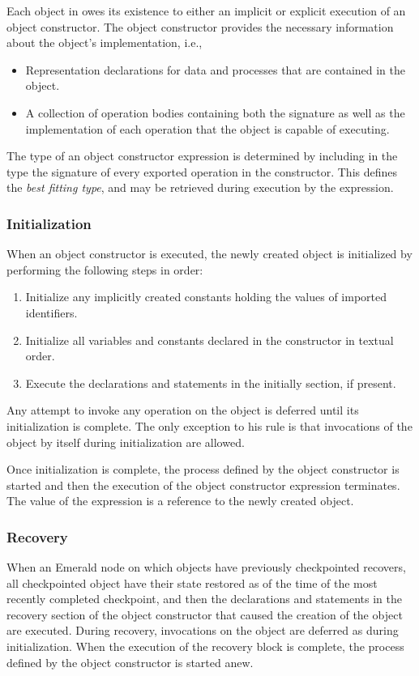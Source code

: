 Each object in \emd{} owes its existence to either an implicit or explicit
execution of an object constructor. The object constructor provides the
necessary information about the object's implementation, i.e.,
\begin{itemize}
\item{} Representation declarations for data and processes that are
contained in the object.
\item{} A collection of operation bodies containing both the signature as
well as the implementation of each operation that the object is capable of
executing.
\end{itemize}
The type of an object constructor expression is determined by including in
the type the signature of every exported operation in the constructor.  This
defines the {\it
best fitting type}, and may be retrieved during execution by the 
expression.\label{typeofobjectconstructor}

\subsubsection{Initialization}
When an object constructor is executed, the newly created object is
initialized by performing the following steps in order:
\begin{enumerate}
  \item{} Initialize any implicitly created constants holding the values
    of imported identifiers.
  \item{} Initialize all variables and constants declared in the constructor
    in textual order.
  \item{} Execute the declarations and statements in the initially section,
    if present.
\end{enumerate}
Any attempt to invoke any operation on the object is deferred until
its initialization is complete.  The only exception to his rule is that
invocations of the object by itself during initialization are allowed.

Once initialization is complete, the process defined by the object
constructor is started and then the execution of the object constructor
expression terminates.  The value of the expression is a reference to the
newly created object.

\subsubsection{Recovery}
When an Emerald node on which objects have previously checkpointed recovers,
all checkpointed object have their state restored as of the time of the most
recently completed checkpoint, and then the declarations and statements in
the recovery section of the object constructor that caused the creation of
the object are executed.  During recovery, invocations on the object are
deferred as during initialization.  When the execution of the recovery block
is complete, the process defined by the object constructor is started anew.

